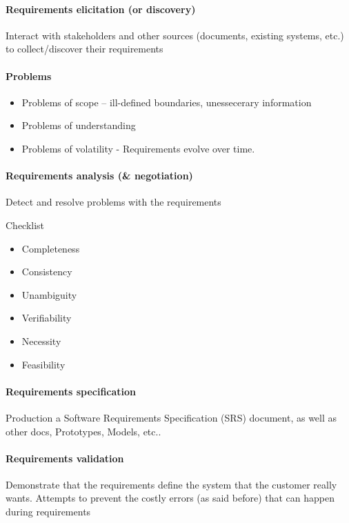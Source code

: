 \documentclass[../ESOF_notes.tex]{subfiles}
\begin{document}
\paragraph{Requirements elicitation (or discovery)}

Interact with stakeholders and other sources (documents, existing systems, etc.) to collect/discover their requirements

\paragraph{Problems}

\begin{itemize}
    \item Problems of scope – ill-defined boundaries, unessecerary information
    \item Problems of understanding
    \item Problems of volatility - Requirements evolve over time.
\end{itemize}

\paragraph{Requirements analysis (\& negotiation)}

Detect and resolve problems with the requirements

Checklist
\begin{itemize}
    \item Completeness
    \item Consistency
    \item Unambiguity
    \item Verifiability
    \item Necessity
    \item Feasibility
\end{itemize}

\paragraph{Requirements specification}
Production a Software Requirements Specification (SRS) document, as well as other docs, Prototypes, Models, etc..

\paragraph{Requirements validation}

Demonstrate that the requirements define the system that the customer really wants. Attempts to prevent the costly errors (as said before) that can happen during requirements
\end{document}
